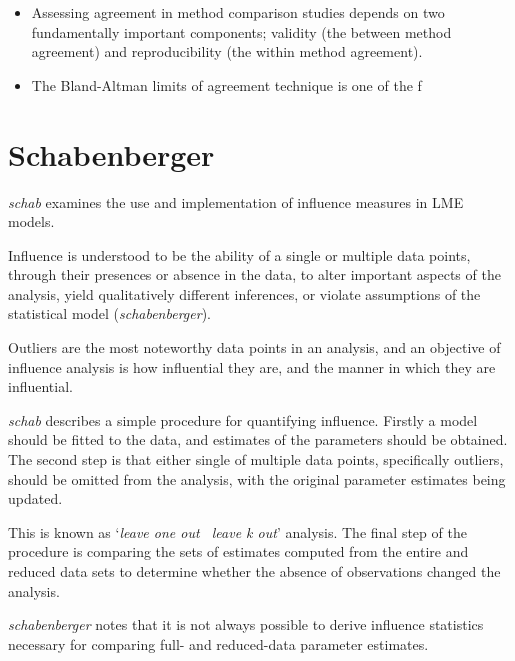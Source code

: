 \documentclass[12pt, a4paper]{report}
\theoremstyle{plain}
\theoremstyle{definition}
\theoremstyle{remark}
\begin{document}
\begin{itemize}
	\item Assessing agreement in method comparison studies depends on two fundamentally important 
	components; validity (the between method agreement) and reproducibility (the within method 
	agreement). 
	\item The Bland-Altman limits of agreement technique is one of the f
\end{itemize}



\section{Schabenberger}

\emph{schab} examines the use and implementation of
influence measures in LME models.

Influence is understood to be the ability of a single or multiple
data points, through their presences or absence in the data, to
alter important aspects of the analysis, yield qualitatively
different inferences, or violate assumptions of the statistical
model (\textit{schabenberger}).

Outliers are the most noteworthy data points in an analysis, and
an objective of influence analysis is how influential they are,
and the manner in which they are influential.

\emph{schab} describes a simple procedure for quantifying
influence. Firstly a model should be fitted to the data, and
estimates of the parameters should be obtained. The second step is
that either single of multiple data points, specifically outliers,
should be omitted from the analysis, with the original parameter
estimates being updated. 

This is known as `\textit{leave one out \ leave k
	out}' analysis. The final step of the procedure is comparing the
sets of estimates computed from the entire and reduced data sets
to determine whether the absence of observations changed the
analysis.

\textit{schabenberger} notes that it is not always possible to
derive influence statistics necessary for comparing full- and
reduced-data parameter estimates. 

%
%
\end{document}
